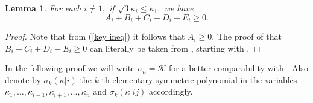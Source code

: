 \documentclass{amsart}
\newtheorem{lemma}[theorem]{Lemma}
\theoremstyle{definition}
\theoremstyle{remark}
\numberwithin{equation}{section}
\begin{document}
\begin{lemma}\label{app2}
For each $i\ne 1,$ if $\sqrt{3}\kappa_i\leq \kappa_1,$ we have
\[A_i+B_i+C_i+D_i-E_i\geq 0.\]
\end{lemma}
\begin{proof}
Note that from (\ref{key ineq}) it follows that $A_i\geq 0.$ The proof of that $B_i+C_i+D_i-E_i\geq 0$ can literally be taken from \cite[Lemma 4.2]{Guan}, starting with \cite[Equ.~(4.10)]{Guan}.
\end{proof}

In the following proof we will write $\sigma_n=\mathcal{K}$ for a better comparability with \cite[Lemma~4.3]{Guan}. Also denote by $\sigma_k(\kappa|i)$ the $k$-th elementary symmetric polynomial in the variables $\kappa_1,\dots,\kappa_{i-1},\kappa_{i+1},\dots,\kappa_n$ and $\sigma_k(\kappa|ij)$ accordingly.
\end{document}
